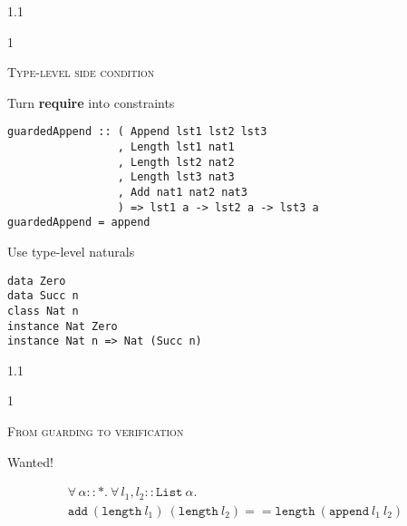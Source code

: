 \documentclass{slides}
\newcommand{\header}[1]{{\large\scshape \color{Red} #1} \medskip }
\newcommand{\blau}[1]{{\color{Blue} #1} \medskip }
\newenvironment{myslide}{\begin{slide}\color{Blue}\begin{boxedminipage}{1.1\hsize}\begin{boxedminipage}{1\hsize}\color{Black}
\vspace{-170\in}
}{%
\smallskip
\end{boxedminipage}
\end{boxedminipage}
\end{slide}}
\begin{document}



\begin{myslide}

\header{Type-level side condition}

\blau{Turn \textbf{require} into constraints}

\begin{Verbatim}[fontseries=normal,fontsize=\tiny]
guardedAppend :: ( Append lst1 lst2 lst3
                 , Length lst1 nat1
                 , Length lst2 nat2
                 , Length lst3 nat3
                 , Add nat1 nat2 nat3
                 ) => lst1 a -> lst2 a -> lst3 a
guardedAppend = append
\end{Verbatim}

\blau{Use type-level naturals}

\begin{Verbatim}[fontseries=normal,fontsize=\tiny]
data Zero
data Succ n
class Nat n
instance Nat Zero
instance Nat n => Nat (Succ n)
\end{Verbatim}

\end{myslide}






\begin{myslide}

\header{From guarding to verification}

\blau{Wanted!}

{\tiny

\[\begin{array}{l}
\forall\,\alpha :: *.\ \forall\,l_1, l_2 :: \texttt{List}\ \alpha.\\ 
\texttt{add}\ (\texttt{length}\ l_1)\ (\texttt{length}\ l_2) == 
\texttt{length}\ (\texttt{append}\ l_1\ l_2)
\end{array}\]

}

\end{myslide}



\end{document}
